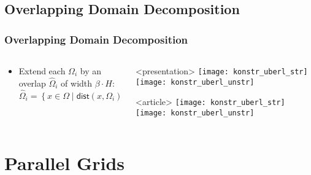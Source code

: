 \subsection{Overlapping Domain Decomposition}
\begin{frame}
  \frametitle<presentation>{Overlapping Domain Decomposition}

  \begin{columns}
    \begin{column}{0.6\linewidth}

      \begin{itemize}
      \item Extend each $\Omega_i$ by an overlap $\hat \Omega_i$ of width
        $\beta\cdot H$:
        \[
        \hat \Omega_i = \left\{ x\in\Omega \mid \mathsf{dist}(x,\Omega_i) < \beta\cdot H \right\}
        \]
      \end{itemize}
    \end{column}
    \begin{column}{0.4\linewidth}
      \begin{onlyenv}<presentation>
        \texttt{[image: konstr\_uberl\_str]}
        \vskip5mm
        \texttt{[image: konstr\_uberl\_unstr]}
      \end{onlyenv}
      \begin{onlyenv}<article>
        \texttt{[image: konstr\_uberl\_str]}
        \vskip5mm
        \texttt{[image: konstr\_uberl\_unstr]}
      \end{onlyenv}
    \end{column}
  \end{columns}
\end{frame}

\section{Parallel Grids}


